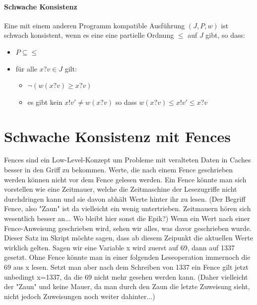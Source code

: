 \documentclass[a4paper,10pt, oneside]{book}
\begin{document}
\paragraph{Schwache Konsistenz}
Eine mit einem anderen Programm kompatible Ausführung $(J,P,w)$ ist schwach konsistent, wenn es eine 
eine partielle Ordnung $\leq$ auf $J$ gibt, so dass:
\begin{itemize}
	\item $P \subseteq \leq$
	\item für alle $x?v \in J$ gilt:
	\begin{itemize}
		\item $\neg(w(x?v) \geq x?v)$
		\item es gibt kein $x!v' \not= w(x?v)$ so dass $w(x?v) \leq x!v' \leq x?v$
	\end{itemize}
\end{itemize}

\section{Schwache Konsistenz mit Fences}
Fences sind ein Low-Level-Konzept um Probleme mit veralteten Daten in Caches besser in den Griff zu bekommen. Werte, die nach einem Fence geschrieben werden können nicht vor dem Fence gelesen werden. Ein Fence könnte man sich vorstellen wie eine Zeitmauer, welche die Zeitmaschine der Lesezugriffe nicht durchdringen kann und sie davon abhält Werte hinter ihr zu lesen. (Der Begriff Fence, also "Zaun" ist da vielleicht ein wenig untertrieben. Zeitmauern hören sich wesentlich besser an... Wo bleibt hier sonst die Epik?) Wenn ein Wert nach einer Fence-Anweisung geschrieben wird, sehen wir alles, was davor geschrieben wurde. Dieser Satz im Skript möchte sagen, dass ab diesem Zeipunkt die aktuellen Werte wirklich gelten. Sagen wir eine Variable x wird zuerst auf 69, dann auf 1337 gesetzt. Ohne Fence könnte man in einer folgenden Leseoperation immernoch die 69 aus x lesen. Setzt man aber nach dem Schreiben von 1337 ein Fence gilt jetzt unbedingt x=1337, da die 69 nicht mehr gesehen werden kann. (Daher vielleicht der "Zaun" und keine Mauer, da man durch den Zaun die letzte Zuweisung sieht, nicht jedoch Zuweisungen noch weiter dahinter...) 
\end{document}
